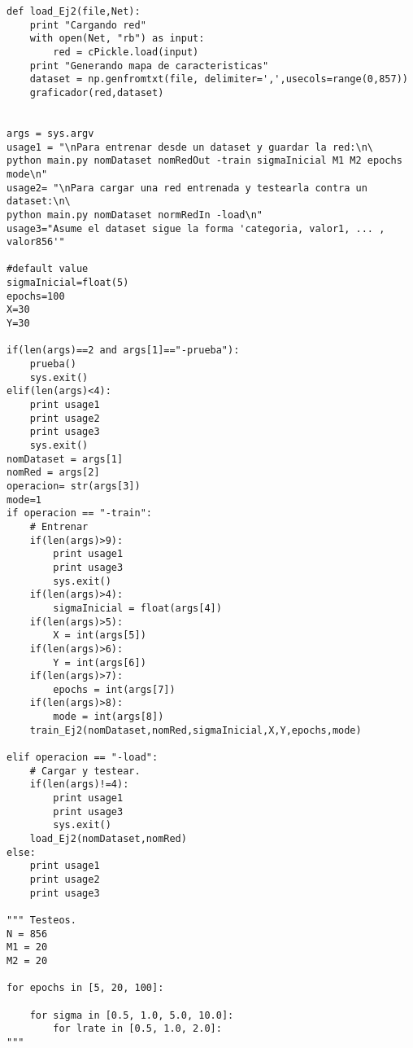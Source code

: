 \begin{lstlisting}[caption=main.py]
def load_Ej2(file,Net):
	print "Cargando red"
	with open(Net, "rb") as input:
		red = cPickle.load(input)
	print "Generando mapa de caracteristicas"
	dataset = np.genfromtxt(file, delimiter=',',usecols=range(0,857))
	graficador(red,dataset)


args = sys.argv
usage1 = "\nPara entrenar desde un dataset y guardar la red:\n\
python main.py nomDataset nomRedOut -train sigmaInicial M1 M2 epochs mode\n"
usage2= "\nPara cargar una red entrenada y testearla contra un dataset:\n\
python main.py nomDataset normRedIn -load\n"
usage3="Asume el dataset sigue la forma 'categoria, valor1, ... , valor856'"

#default value
sigmaInicial=float(5)
epochs=100
X=30
Y=30

if(len(args)==2 and args[1]=="-prueba"):
	prueba()
	sys.exit()
elif(len(args)<4):
	print usage1
	print usage2
	print usage3
	sys.exit()
nomDataset = args[1]
nomRed = args[2]
operacion= str(args[3])
mode=1
if operacion == "-train":
	# Entrenar
	if(len(args)>9):
		print usage1
		print usage3
		sys.exit()
	if(len(args)>4):
		sigmaInicial = float(args[4])
	if(len(args)>5):
		X = int(args[5])
	if(len(args)>6):
		Y = int(args[6])
	if(len(args)>7):
		epochs = int(args[7])
	if(len(args)>8):
		mode = int(args[8])
	train_Ej2(nomDataset,nomRed,sigmaInicial,X,Y,epochs,mode)

elif operacion == "-load":
	# Cargar y testear.
	if(len(args)!=4):
		print usage1
		print usage3
		sys.exit()
	load_Ej2(nomDataset,nomRed)
else:
	print usage1
	print usage2
	print usage3

""" Testeos.
N = 856
M1 = 20
M2 = 20

for epochs in [5, 20, 100]:
	
	for sigma in [0.5, 1.0, 5.0, 10.0]:
		for lrate in [0.5, 1.0, 2.0]:
"""
\end{lstlisting}




